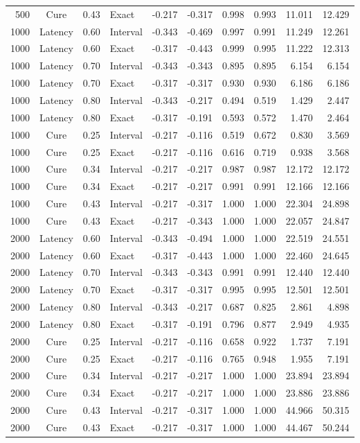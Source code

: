\documentclass[12pt]{article}
\theoremstyle{definition}
\theoremstyle{remark}
\begin{document}
\begin{longtable}{rcrlrrrrrr}
500 & Cure & 0.43 & Exact & -0.217 & -0.317 & 0.998 & 0.993 & 11.011 & 12.429 \\
1000 & Latency & 0.60 & Interval & -0.343 & -0.469 & 0.997 & 0.991 & 11.249 & 12.261 \\
1000 & Latency & 0.60 & Exact & -0.317 & -0.443 & 0.999 & 0.995 & 11.222 & 12.313 \\
1000 & Latency & 0.70 & Interval & -0.343 & -0.343 & 0.895 & 0.895 & 6.154 & 6.154 \\
1000 & Latency & 0.70 & Exact & -0.317 & -0.317 & 0.930 & 0.930 & 6.186 & 6.186 \\
1000 & Latency & 0.80 & Interval & -0.343 & -0.217 & 0.494 & 0.519 & 1.429 & 2.447 \\
1000 & Latency & 0.80 & Exact & -0.317 & -0.191 & 0.593 & 0.572 & 1.470 & 2.464 \\
1000 & Cure & 0.25 & Interval & -0.217 & -0.116 & 0.519 & 0.672 & 0.830 & 3.569 \\
1000 & Cure & 0.25 & Exact & -0.217 & -0.116 & 0.616 & 0.719 & 0.938 & 3.568 \\
1000 & Cure & 0.34 & Interval & -0.217 & -0.217 & 0.987 & 0.987 & 12.172 & 12.172 \\
1000 & Cure & 0.34 & Exact & -0.217 & -0.217 & 0.991 & 0.991 & 12.166 & 12.166 \\
1000 & Cure & 0.43 & Interval & -0.217 & -0.317 & 1.000 & 1.000 & 22.304 & 24.898 \\
1000 & Cure & 0.43 & Exact & -0.217 & -0.343 & 1.000 & 1.000 & 22.057 & 24.847 \\
2000 & Latency & 0.60 & Interval & -0.343 & -0.494 & 1.000 & 1.000 & 22.519 & 24.551 \\
2000 & Latency & 0.60 & Exact & -0.317 & -0.443 & 1.000 & 1.000 & 22.460 & 24.645 \\
2000 & Latency & 0.70 & Interval & -0.343 & -0.343 & 0.991 & 0.991 & 12.440 & 12.440 \\
2000 & Latency & 0.70 & Exact & -0.317 & -0.317 & 0.995 & 0.995 & 12.501 & 12.501 \\
2000 & Latency & 0.80 & Interval & -0.343 & -0.217 & 0.687 & 0.825 & 2.861 & 4.898 \\
2000 & Latency & 0.80 & Exact & -0.317 & -0.191 & 0.796 & 0.877 & 2.949 & 4.935 \\
2000 & Cure & 0.25 & Interval & -0.217 & -0.116 & 0.658 & 0.922 & 1.737 & 7.191 \\
2000 & Cure & 0.25 & Exact & -0.217 & -0.116 & 0.765 & 0.948 & 1.955 & 7.191 \\
2000 & Cure & 0.34 & Interval & -0.217 & -0.217 & 1.000 & 1.000 & 23.894 & 23.894 \\
2000 & Cure & 0.34 & Exact & -0.217 & -0.217 & 1.000 & 1.000 & 23.886 & 23.886 \\
2000 & Cure & 0.43 & Interval & -0.217 & -0.317 & 1.000 & 1.000 & 44.966 & 50.315 \\
2000 & Cure & 0.43 & Exact & -0.217 & -0.317 & 1.000 & 1.000 & 44.467 & 50.244 \\
\end{longtable}
\endgroup
\end{document}
